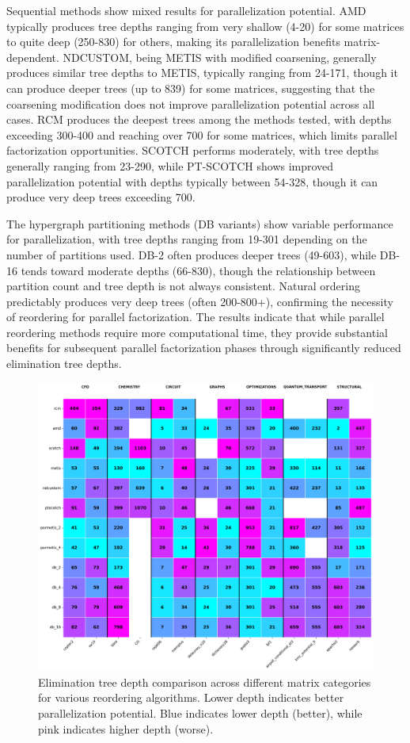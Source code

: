 Sequential methods show mixed results for parallelization potential. AMD typically produces tree depths ranging from very shallow (4-20) for some matrices to quite deep (250-830) for others, making its parallelization benefits matrix-dependent. NDCUSTOM, being METIS with modified coarsening, generally produces similar tree depths to METIS, typically ranging from 24-171, though it can produce deeper trees (up to 839) for some matrices, suggesting that the coarsening modification does not improve parallelization potential across all cases. RCM produces the deepest trees among the methods tested, with depths exceeding 300-400 and reaching over 700 for some matrices, which limits parallel factorization opportunities. SCOTCH performs moderately, with tree depths generally ranging from 23-290, while PT-SCOTCH shows improved parallelization potential with depths typically between 54-328, though it can produce very deep trees exceeding 700.

The hypergraph partitioning methods (DB variants) show variable performance for parallelization, with tree depths ranging from 19-301 depending on the number of partitions used. DB-2 often produces deeper trees (49-603), while DB-16 tends toward moderate depths (66-830), though the relationship between partition count and tree depth is not always consistent. Natural ordering predictably produces very deep trees (often 200-800+), confirming the necessity of reordering for parallel factorization. The results indicate that while parallel reordering methods require more computational time, they provide substantial benefits for subsequent parallel factorization phases through significantly reduced elimination tree depths.


\begin{figure}[h]
\centering
\includegraphics[width=1\textwidth]{fig/res/elimination_tree_depth_all_categories.png}
\caption{Elimination tree depth comparison across different matrix categories for various reordering algorithms. Lower depth indicates better parallelization potential. Blue indicates lower depth (better), while pink indicates higher depth (worse).}
\label{fig:elimination-tree-depth}
\end{figure}

